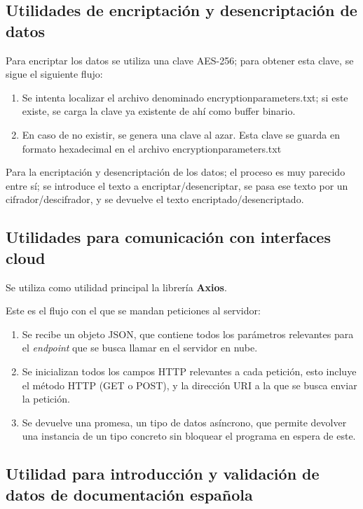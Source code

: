 \documentclass[12pt,a4paper,twoside,openright]{book}
\begin{document}
\subsection{Utilidades de encriptación y desencriptación de datos}

Para encriptar los datos se utiliza una clave AES-256; para obtener esta clave, se sigue el siguiente flujo:

\begin{enumerate}
  \item Se intenta localizar el archivo denominado encryptionparameters.txt; si este existe, se carga la clave ya existente de ahí como buffer binario.
  \item En caso de no existir, se genera una clave al azar. Esta clave se guarda en formato hexadecimal en el archivo encryptionparameters.txt
\end{enumerate}

Para la encriptación y desencriptación de los datos; el proceso es muy parecido entre sí; se introduce el texto a encriptar/desencriptar, se pasa ese texto por un cifrador/descifrador, y se devuelve el texto encriptado/desencriptado.

\subsection{Utilidades para comunicación con interfaces cloud}

Se utiliza como utilidad principal la librería \textbf{Axios}.

Este es el flujo con el que se mandan peticiones al servidor:

\begin{enumerate}
  \item Se recibe un objeto JSON, que contiene todos los parámetros relevantes para el \textit{endpoint} que se busca llamar en el servidor en nube.
  \item Se inicializan todos los campos HTTP relevantes a cada petición, esto incluye el método HTTP (GET o POST), y la dirección URI a la que se busca enviar la petición.
  \item Se devuelve una promesa, un tipo de datos asíncrono, que permite devolver una instancia de un tipo concreto sin bloquear el programa en espera de este.
\end{enumerate}

\subsection{Utilidad para introducción y validación de datos de documentación española}
\end{document}

